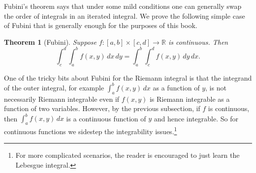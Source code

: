 \documentclass[12pt,openany]{book}
\newcommand{\R}{{\mathbb{R}}}
\theoremstyle{plain}
\newtheorem{thm}{Theorem}[section]
\theoremstyle{remark}
\theoremstyle{definition}
\theoremstyle{exercise}
\theoremstyle{example}
\begin{document}
Fubini's theorem says that under some mild conditions one can generally
swap the order of integrals in an iterated integral.
We prove the following simple case of Fubini that is generally
enough for the purposes of this book.

\begin{thm}[Fubini]\label{thm:fubini}
Suppose $f \colon [a,b] \times [c,d] \to \R$ is continuous.  Then
\begin{equation*}
\int_c^d \int_a^b f(x,y) \, dx \, dy =
\int_a^b \int_c^d f(x,y) \, dy \, dx .
\end{equation*}
\end{thm}

One of the tricky bits about Fubini for the Riemann integral
is that the integrand of the outer integral, for example
$\int_a^b f(x,y) \, dx$ as a function of $y$, is not necessarily 
Riemann integrable even if $f(x,y)$ is Riemann integrable as a function of
two variables.  However, by the previous subsection, if $f$ is continuous,
then $\int_a^b f(x,y) \, dx$ is a continuous function of $y$ and hence
integrable.  So for continuous functions we sidestep the integrability
issues.\footnote{For more complicated scenarios, the reader is
encouraged to just learn the Lebesgue integral.}
\end{document}
